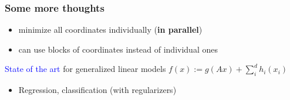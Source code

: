 \documentclass[aspectratio=149]{beamer}
\begin{document}
\begin{frame}
  \frametitle{Some more thoughts}
  \begin{itemize}
    \item minimize all coordinates individually (\textbf{in parallel})
    \item can use blocks of coordinates instead of individual ones
  \end{itemize}

  \textcolor{blue}{State of the art} for generalized linear models $f(x) := g(Ax) + \sum_{i}^{d} h_i(x_i)$
  \begin{itemize}
    \item Regression, classification (with regularizers)
  \end{itemize}
\end{frame}
\end{document}
